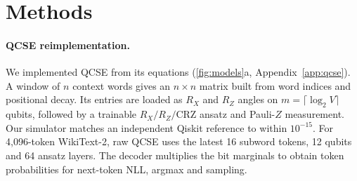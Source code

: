 \documentclass[11pt,a4paper]{article}
\begin{document}
\section{Methods}
\label{sec:methods}

\paragraph{QCSE reimplementation.}
We implemented QCSE from its equations (\cref{fig:models}a, Appendix~\ref{app:qcse}). A window of $n$ context words gives an $n\times n$ matrix built from word indices and positional decay. Its entries are loaded as $R_X$ and $R_Z$ angles on $m=\lceil\log_2 V\rceil$ qubits, followed by a trainable $R_X/R_Z/\mathrm{CRZ}$ ansatz and Pauli-$Z$ measurement. Our simulator matches an independent Qiskit reference to within $10^{-15}$. For 4,096-token WikiText-2, raw QCSE uses the latest 16 subword tokens, 12 qubits and 64 ansatz layers. The decoder multiplies the bit marginals to obtain token probabilities for next-token NLL, argmax and sampling.
\end{document}
